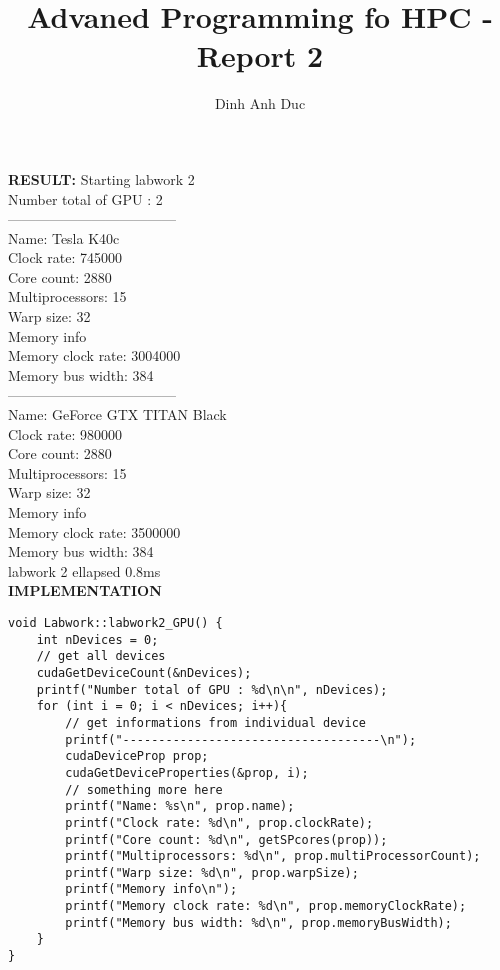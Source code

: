 \documentclass[10pt, a4paper]{article}
\title{Advaned Programming fo HPC - Report 2}
\author{Dinh Anh Duc}
\begin{document}
\maketitle

\textbf{RESULT:}
Starting labwork 2
\\
Number total of GPU : 2
\\
------------------------------------
\\
Name: Tesla K40c
\\
Clock rate: 745000
\\
Core count: 2880
\\
Multiprocessors: 15
\\
Warp size: 32
\\
Memory info
\\
Memory clock rate: 3004000
\\
Memory bus width: 384
\\
------------------------------------
\\
Name: GeForce GTX TITAN Black
\\
Clock rate: 980000
\\
Core count: 2880
\\
Multiprocessors: 15
\\
Warp size: 32
\\
Memory info
\\
Memory clock rate: 3500000
\\
Memory bus width: 384
\\
labwork 2 ellapsed 0.8ms
\\
\textbf{IMPLEMENTATION}
\begin{lstlisting}
void Labwork::labwork2_GPU() {
    int nDevices = 0;
    // get all devices
    cudaGetDeviceCount(&nDevices);
    printf("Number total of GPU : %d\n\n", nDevices);
    for (int i = 0; i < nDevices; i++){
        // get informations from individual device
        printf("------------------------------------\n");
        cudaDeviceProp prop;
        cudaGetDeviceProperties(&prop, i);
        // something more here
        printf("Name: %s\n", prop.name);
        printf("Clock rate: %d\n", prop.clockRate);
        printf("Core count: %d\n", getSPcores(prop));
        printf("Multiprocessors: %d\n", prop.multiProcessorCount);
        printf("Warp size: %d\n", prop.warpSize);
        printf("Memory info\n");
        printf("Memory clock rate: %d\n", prop.memoryClockRate);
        printf("Memory bus width: %d\n", prop.memoryBusWidth);
    }
}
\end{lstlisting}
\end{document}
